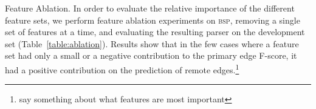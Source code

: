 \documentclass[11pt]{article}
\makeatletter
\newcommand{\oa}[1]{\footnote{\color{red} #1}}
\newcommand{\secref}[1]{Section~\ref{#1}}
\newcommand{\figref}[1]{Figure~\ref{#1}}
\newcommand{\tabref}[1]{Table~\ref{#1}}
\renewcommand{\paragraph}{
  \@startsection{paragraph}{4}
  {\z@}{.5ex \@plus .5ex \@minus .2ex}{-1em}
  {\normalfont\normalsize\bfseries}
}
\makeatother
\begin{document}
\paragraph{Feature Ablation.}
In order to evaluate the relative importance of the different feature sets,
we perform feature ablation experiments on \textsc{bsp},
removing a single set of features at a time,
and evaluating the resulting parser on the development set (\tabref{table:ablation}).
Results show that in the few cases where a feature set had only a small
or a negative contribution to the primary edge F-score, 
it had a positive contribution on the prediction of
remote edges.\oa{say something about what features are most important}


\begin{table}[ht]
\caption{
  Results in percents of the feature ablation experiment.
  See \figref{fig:features} for the definition of each feature set; \textbf{disco} refers to all discontiguous features, and \textbf{ratio} is the number of terminals divided by the total number of nodes (\secref{subsec:features}).
}
\label{table:ablation}
\end{table}
\end{document}
